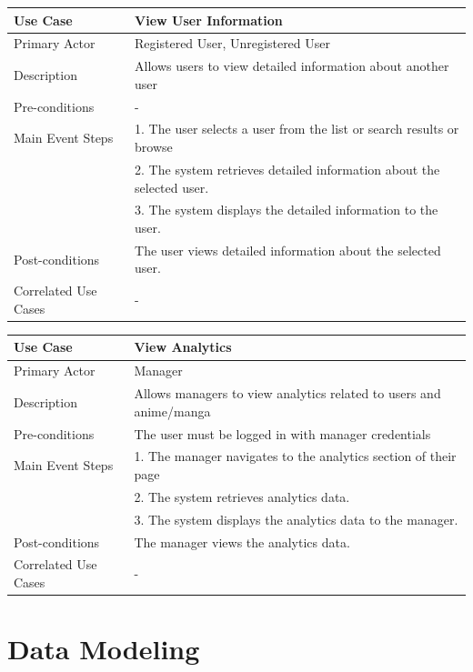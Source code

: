 \begin{longtable}{|p{}|p{}|}
    \hline
    \rowcolor{lightblue}
    \textbf{Use Case} & \textbf{View User Information} \\
    \hline
    Primary Actor & Registered User, Unregistered User\\
    \hline
    Description & Allows users to view detailed information about another user\\
    \hline
    Pre-conditions & -\\
    \hline
    Main Event Steps& 1. The user selects a user from the list or search results or browse \\
    & 2. The system retrieves detailed information about the selected user. \\
    & 3. The system displays the detailed information to the user. \\
    \hline
    Post-conditions &The user views detailed information about the selected user.  \\
    \hline
    Correlated Use Cases & - \\
    \hline
\end{longtable}

\begin{longtable}{|p{}|p{}|}
    \hline
    \rowcolor{lightblue}
    \textbf{Use Case} & \textbf{View Analytics} \\
    \hline
    Primary Actor & Manager \\
    \hline
    Description & Allows managers to view analytics related to users and anime/manga\\
    \hline
    Pre-conditions & The user must be logged in with manager credentials\\
    \hline
    Main Event Steps & 1. The manager navigates to the analytics section of their page \\
    & 2. The system retrieves analytics data. \\
    & 3. The system displays the analytics data to the manager. \\
    \hline
    Post-conditions & The manager views the analytics data.\\
    \hline
    Correlated Use Cases & -\\
    \hline
\end{longtable}

\newpage

\section{Data Modeling}


